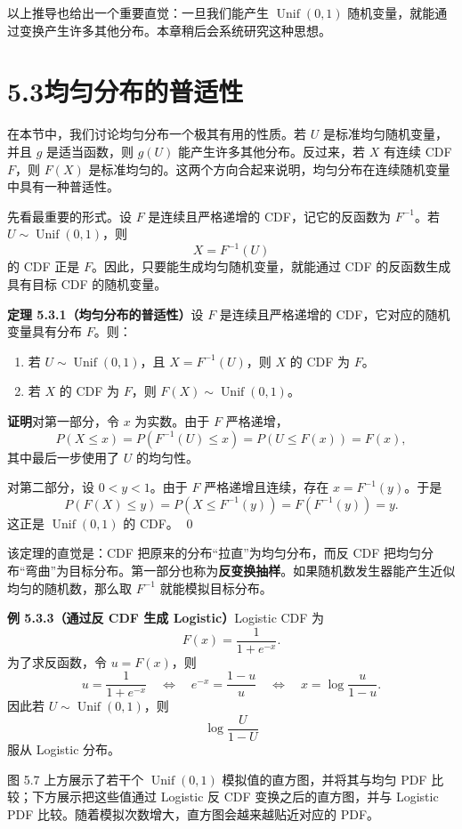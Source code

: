 \documentclass[UTF8, 12pt, fontset=fandol, oneside]{ctexart}
\begin{document}
以上推导也给出一个重要直觉：一旦我们能产生 $\operatorname{Unif}(0,1)$ 随机变量，就能通过变换产生许多其他分布。本章稍后会系统研究这种思想。

\section*{5.3\quad 均匀分布的普适性}

在本节中，我们讨论均匀分布一个极其有用的性质。若 $U$ 是标准均匀随机变量，并且 $g$ 是适当函数，则 $g(U)$ 能产生许多其他分布。反过来，若 $X$ 有连续 CDF $F$，则 $F(X)$ 是标准均匀的。这两个方向合起来说明，均匀分布在连续随机变量中具有一种普适性。

先看最重要的形式。设 $F$ 是连续且严格递增的 CDF，记它的反函数为 $F^{-1}$。若 $U\sim\operatorname{Unif}(0,1)$，则
\[
  X=F^{-1}(U)
\]
的 CDF 正是 $F$。因此，只要能生成均匀随机变量，就能通过 CDF 的反函数生成具有目标 CDF 的随机变量。

\noindent\textbf{定理 5.3.1（均匀分布的普适性）}\quad 设 $F$ 是连续且严格递增的 CDF，它对应的随机变量具有分布 $F$。则：
\begin{enumerate}
  \item 若 $U\sim\operatorname{Unif}(0,1)$，且 $X=F^{-1}(U)$，则 $X$ 的 CDF 为 $F$。
  \item 若 $X$ 的 CDF 为 $F$，则 $F(X)\sim\operatorname{Unif}(0,1)$。
\end{enumerate}

\noindent\textbf{证明}\quad 对第一部分，令 $x$ 为实数。由于 $F$ 严格递增，
\[
  P(X\le x)=P(F^{-1}(U)\le x)=P(U\le F(x))=F(x),
\]
其中最后一步使用了 $U$ 的均匀性。

对第二部分，设 $0<y<1$。由于 $F$ 严格递增且连续，存在 $x=F^{-1}(y)$。于是
\[
  P(F(X)\le y)=P(X\le F^{-1}(y))=F(F^{-1}(y))=y.
\]
这正是 $\operatorname{Unif}(0,1)$ 的 CDF。
\qed

该定理的直觉是：CDF 把原来的分布“拉直”为均匀分布，而反 CDF 把均匀分布“弯曲”为目标分布。第一部分也称为\textbf{反变换抽样}。如果随机数发生器能产生近似均匀的随机数，那么取 $F^{-1}$ 就能模拟目标分布。

\noindent\textbf{例 5.3.3（通过反 CDF 生成 Logistic）}\quad Logistic CDF 为
\[
  F(x)=\frac{1}{1+e^{-x}}.
\]
为了求反函数，令 $u=F(x)$，则
\[
  u=\frac{1}{1+e^{-x}}
  \quad\Longleftrightarrow\quad
  e^{-x}=\frac{1-u}{u}
  \quad\Longleftrightarrow\quad
  x=\log\frac{u}{1-u}.
\]
因此若 $U\sim\operatorname{Unif}(0,1)$，则
\[
  \log\frac{U}{1-U}
\]
服从 Logistic 分布。

图 5.7 上方展示了若干个 $\operatorname{Unif}(0,1)$ 模拟值的直方图，并将其与均匀 PDF 比较；下方展示把这些值通过 Logistic 反 CDF 变换之后的直方图，并与 Logistic PDF 比较。随着模拟次数增大，直方图会越来越贴近对应的 PDF。
\end{document}
